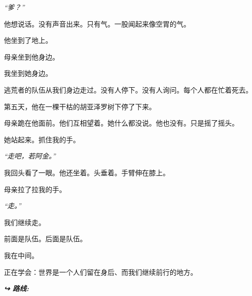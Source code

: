 \noindent \textit{“爹？”}

\noindent 他想说话。没有声音出来。只有气。一股闻起来像空胃的气。

\noindent 他坐到了地上。

\noindent 母亲坐到他身边。

\noindent 我坐到她身边。

\noindent 逃荒者的队伍从我们身边走过。没有人停下。没有人询问。每个人都在忙着死去。

\noindent 第五天，他在一棵干枯的胡亚泽罗树下停了下来。

\noindent 母亲跪在他面前。他们互相望着。她什么都没说。他也没有。只是摇了摇头。

\noindent 她站起来。抓住我的手。

\noindent \textit{“走吧，若阿金。”}

\noindent 我回头看了一眼。他还坐着。头垂着。手臂伸在膝上。

\noindent 母亲拉了拉我的手。

\noindent \textit{“走。”}

\noindent 我们继续走。

\noindent 前面是队伍。后面是队伍。

\noindent 我在中间。

\noindent 正在学会：世界是一个人们留在身后、而我们继续前行的地方。

\vspace{0.5em}
\noindent\textit{\textbf{↪ 路线:}  \rotasep {} \rotasep {}}
